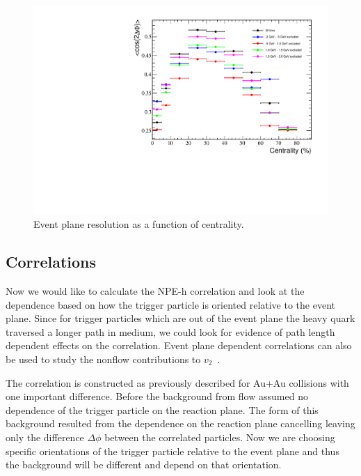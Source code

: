 \begin{figure}[htbp]
\begin{center}
\includegraphics[scale=.75]{Plots/Correlations/EPRes_MRP.pdf}
\end{center}
\caption[Event Plane Resolutions]{Event plane resolution as a function of centrality.}
\label{fig:EPRes_MRP}
\end{figure}

\subsection{Correlations}

Now we would like to calculate the NPE-h correlation and look at the dependence based on how the trigger particle is oriented relative to the event plane. Since for trigger particles which are out of the event plane the heavy quark traversed a longer path in medium, we could look for evidence of path length dependent effects on the correlation. Event plane dependent correlations can also be used to study the nonflow contributions to $v_2$~\cite{CERESEP}.

The correlation is constructed as previously described for Au+Au collisions with one important difference. Before the background from flow assumed no dependence of the trigger particle on the reaction plane. The form of this background resulted from the dependence on the reaction plane cancelling leaving only the difference $\Delta\phi$ between the correlated particles. Now we are choosing specific orientations of the trigger particle relative to the event plane and thus the background will be different and depend on that orientation.

